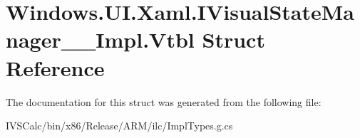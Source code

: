 \hypertarget{struct_windows_1_1_u_i_1_1_xaml_1_1_i_visual_state_manager_____impl_1_1_vtbl}{}\section{Windows.\+U\+I.\+Xaml.\+I\+Visual\+State\+Manager\+\_\+\+\_\+\+Impl.\+Vtbl Struct Reference}
\label{struct_windows_1_1_u_i_1_1_xaml_1_1_i_visual_state_manager_____impl_1_1_vtbl}


The documentation for this struct was generated from the following file\+:\begin{DoxyCompactItemize}
\item 
I\+V\+S\+Calc/bin/x86/\+Release/\+A\+R\+M/ilc/Impl\+Types.\+g.\+cs\end{DoxyCompactItemize}
